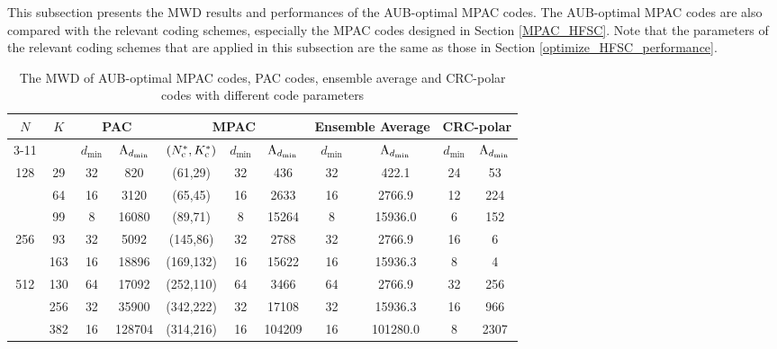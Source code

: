 \documentclass[12pt, draftclsnofoot, peerreview, onecolumn]{IEEEtran}
\theoremstyle{noparent}
\begin{document}
This subsection presents the MWD results and performances of the AUB-optimal MPAC codes.
The AUB-optimal MPAC codes are also compared with the relevant coding schemes, 
especially the MPAC codes designed in Section \ref{MPAC_HFSC}.
Note that the parameters of the relevant coding schemes that are applied in this subsection
are the same as those in Section \ref{optimize_HFSC_performance}.
























\begin{table}[!ht]
	\centering
    \caption{The MWD of AUB-optimal MPAC codes, PAC codes, ensemble average and CRC-polar codes 
    with different code parameters}
	\label{table_chap4_AUB_result}
	\setlength{\tabcolsep}{2.0mm} \renewcommand{\arraystretch}{1.25}
	\begin{tabular}{|c|c|c|c|c|c|c|c|c|c|c|}
		\hline
		\multirow{2}{*}{$N$} & \multirow{2}{*}{$K$} & \multicolumn{2}{c|}{PAC} & \multicolumn{3}{c|}{MPAC} & \multicolumn{2}{c|}{Ensemble Average} & \multicolumn{2}{c|}{CRC-polar} \\ \cline{3-11}
		&  & $d_{\min}$ & ${\rm A}_{d_{\min}}$ & $(N_{\rm c}^*,K_{\rm c}^*)$ & $d_{\min}$ & ${\rm A}_{d_{\min}}$ & $d_{\min}$ & ${\rm A}_{d_{\min}}$ & $d_{\min}$ & ${\rm A}_{d_{\min}}$\\ \hline
		\multirow{3}{*}{128} & 29 & 32 & 820 & (61,29) & 32 & 436 & 32 & 422.1 & 24 & 53 \\ \cline{2-11}
		& 64 & 16 & 3120 & (65,45) & 16 & 2633 & 16 & 2766.9 & 12 & 224 \\ \cline{2-11}
		& 99 & 8 & 16080 & (89,71) & 8 & 15264 & 8 & 15936.0 & 6 & 152 \\ \hline
		\multirow{2}{*}{256} & 93 & 32 & 5092 & (145,86) & 32 & 2788 & 32 & 2766.9 & 16 & 6 \\ \cline{2-11}
		& 163 & 16 & 18896 & (169,132) & 16 & 15622 & 16 & 15936.3 & 8 & 4 \\ \hline
		\multirow{3}{*}{512} & 130 & 64 & 17092 & (252,110) & 64 & 3466 & 64 & 2766.9 & 32 & 256 \\ \cline{2-11}
		& 256 & 32 & 35900 & (342,222) & 32 & 17108 & 32 & 15936.3 & 16 & 966 \\ \cline{2-11}
		& 382 & 16 & 128704 & (314,216) & 16 & 104209 & 16 & 101280.0 & 8 & 2307 \\ \hline
	\end{tabular}
\end{table}
\end{document}
